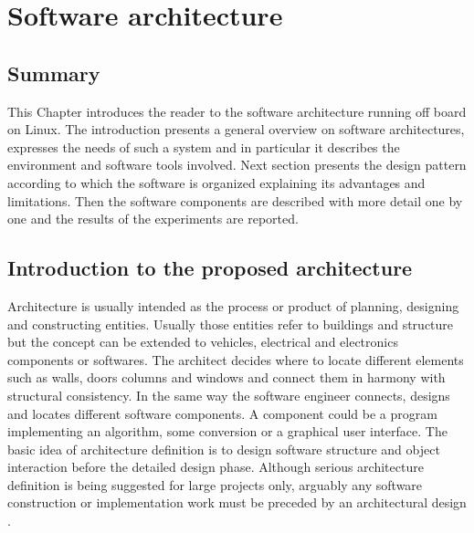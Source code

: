 
\chapter{Software architecture}
\label{chap:sixth
}
\ifpdf
    \graphicspath{{Chapter6/Figures/PNG/}{Chapter6/Figures/PDF/}{Chapter6/Figures/}}
\else
    \graphicspath{{Chapter6/Figures/EPS/}{Chapter6/Figures/}}
\fi

\section*{Summary}

This Chapter introduces the reader to the software architecture running off board on Linux. The introduction presents a  general overview on software architectures, expresses the needs of such a system and in particular it describes the environment and software tools involved. Next section presents the design pattern according to which the software is organized explaining its advantages and limitations. Then the software components are described with more detail one by one and the results of the experiments are reported. 
\section{Introduction to the proposed architecture}

Architecture is usually intended as the process or product of planning, designing and constructing entities. Usually those entities refer to buildings and structure but the concept can be extended to vehicles, electrical and electronics components or softwares. The architect decides where to locate different elements such as walls, doors columns and windows and connect them in harmony with structural consistency. In the same way the software engineer connects, designs and locates different software components. A component could be a program implementing an algorithm, some conversion or a graphical user interface. The basic idea of architecture definition is to design software structure and object interaction before the detailed design phase. Although serious architecture definition is being suggested for large projects only, arguably any software construction or implementation work must be preceded by an architectural design \cite{msdn}.
